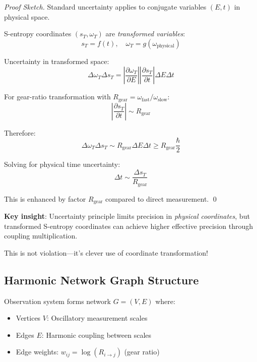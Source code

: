 \documentclass[11pt,onecolumn]{article}
\begin{document}
\begin{proof}[Proof Sketch]
Standard uncertainty applies to conjugate variables $(E, t)$ in physical space.

S-entropy coordinates $(s_T, \omega_T)$ are \textit{transformed variables}:
\begin{equation}
s_T = f(t), \quad \omega_T = g(\omega_{\text{physical}})
\end{equation}

Uncertainty in transformed space:
\begin{equation}
\Delta \omega_T \Delta s_T = \left|\frac{\partial \omega_T}{\partial E}\right| \left|\frac{\partial s_T}{\partial t}\right| \Delta E \Delta t
\end{equation}

For gear-ratio transformation with $R_{\text{gear}} = \omega_{\text{fast}}/\omega_{\text{slow}}$:
\begin{equation}
\left|\frac{\partial s_T}{\partial t}\right| \sim R_{\text{gear}}
\end{equation}

Therefore:
\begin{equation}
\Delta \omega_T \Delta s_T \sim R_{\text{gear}} \Delta E \Delta t \geq R_{\text{gear}} \frac{\hbar}{2}
\end{equation}

Solving for physical time uncertainty:
\begin{equation}
\Delta t \sim \frac{\Delta s_T}{R_{\text{gear}}}
\end{equation}

This is enhanced by factor $R_{\text{gear}}$ compared to direct measurement. \qed
\end{proof}

\textbf{Key insight}: Uncertainty principle limits precision in \textit{physical coordinates}, but transformed S-entropy coordinates can achieve higher effective precision through coupling multiplication.

This is not violation---it's clever use of coordinate transformation!

\subsection{Harmonic Network Graph Structure}

\begin{definition}
Observation system forms network $G = (V, E)$ where:
\begin{itemize}
\item Vertices $V$: Oscillatory measurement scales
\item Edges $E$: Harmonic coupling between scales
\item Edge weights: $w_{ij} = \log(R_{i \to j})$ (gear ratio)
\end{itemize}
\end{definition}
\end{document}
